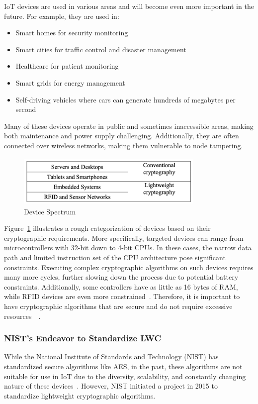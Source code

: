 IoT devices are used in various areas and will become even more important in the future. For example, they are used in:
\begin{itemize}
    \item Smart homes for security monitoring
    \item Smart cities for traffic control and disaster management
    \item Healthcare for patient monitoring
    \item Smart grids for energy management
    \item Self-driving vehicles where cars can generate hundreds of megabytes per second
\end{itemize}
Many of these devices operate in public and sometimes inaccessible areas, making both maintenance and power supply challenging. Additionally, they are often connected over wireless networks, making them vulnerable to node tampering.

\begin{figure}[h]
    \centering
    \includegraphics[width=9.0cm, height=2.5cm]{media/device_spectrum.png}
    \caption{Device Spectrum}
    \label{fig:device_spectrum}
\end{figure}

Figure~\ref{fig:device_spectrum} illustrates a rough categorization of devices based on their cryptographic requirements. More specifically, targeted devices can range from microcontrollers with 32-bit down to 4-bit CPUs. In these cases, the narrow data path and limited instruction set of the CPU architecture pose significant constraints. Executing complex cryptographic algorithms on such devices requires many more cycles, further slowing down the process due to potential battery constraints. Additionally, some controllers have as little as 16 bytes of RAM, while RFID devices are even more constrained~\cite{mckay2016report}. Therefore, it is important to have cryptographic algorithms that are secure and do not require excessive resources~\cite{IOTMarkets}~\cite{dhanda2020lightweight}.



\subsubsection{NIST's Endeavor to Standardize LWC}
While the National Institute of Standards and Technology (NIST) has standardized secure algorithms like AES, in the past, these algorithms are not suitable for use in IoT due to the diversity, scalability, and constantly changing nature of these devices~\cite{ekwueme2024lightweight}. However, NIST initiated a project in 2015 to standardize lightweight cryptographic algorithms.

